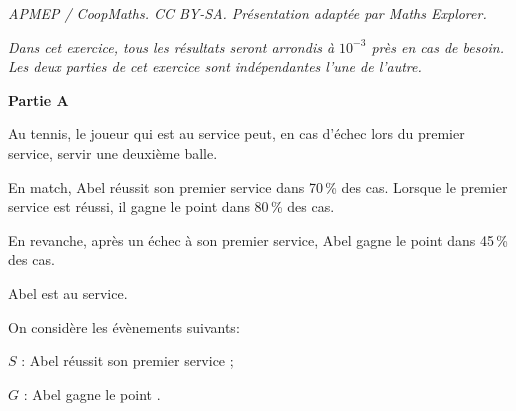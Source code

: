 \documentclass[10pt]{article}
\begin{document}
\noindent\textit{APMEP / CoopMaths. CC BY-SA. Présentation adaptée par Maths Explorer.}\par\medskip
\medskip

\emph{Dans cet exercice, tous les résultats seront arrondis à $10^{-3}$ près en cas de besoin.\\
Les deux parties de cet exercice sont indépendantes l'une de l'autre.}

\bigskip

\textbf{Partie A}

\medskip

Au tennis, le joueur qui est au service peut, en cas d'échec lors du premier service, servir une deuxième balle.

En match, Abel réussit son premier service dans 70\,\% des cas. Lorsque le premier service est réussi, il gagne le point dans 80\,\% des cas.

En revanche, après un échec à son premier service, Abel gagne
le point dans 45\,\% des cas.



Abel est au service.

\begin{list}{\textbullet}{On considère les évènements suivants:}
\item $S$ : \og Abel réussit son premier service \fg{};
\item $G$ : \og Abel gagne le point \fg.
\end{list}
\end{document}
